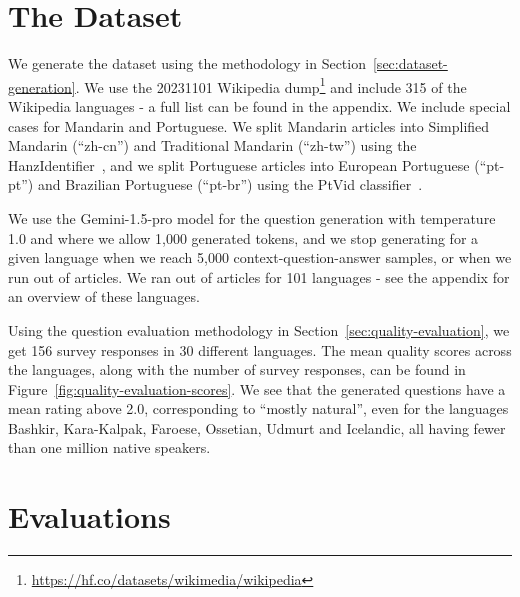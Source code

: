 \documentclass[10pt, a4paper]{article}
\begin{document}
\section{The Dataset}
\label{sec:the-dataset}

We generate the dataset using the methodology in Section~\ref{sec:dataset-generation}. We use the 20231101 Wikipedia dump\footnote{\url{https://hf.co/datasets/wikimedia/wikipedia}} and include 315 of the Wikipedia languages - a full list can be found in the appendix. We include special cases for Mandarin and Portuguese. We split Mandarin articles into Simplified Mandarin (``zh-cn'') and Traditional Mandarin (``zh-tw'') using the HanzIdentifier~\cite{tsroten2024hanzidentifier}, and we split Portuguese articles into European Portuguese (``pt-pt'') and Brazilian Portuguese (``pt-br'') using the PtVid classifier~.

We use the Gemini-1.5-pro model \cite{reid2024gemini} for the question generation with temperature 1.0 and where we allow 1,000 generated tokens, and we stop generating for a given language when we reach 5,000 context-question-answer samples, or when we run out of articles. We ran out of articles for 101 languages - see the appendix for an overview of these languages.

Using the question evaluation methodology in Section~\ref{sec:quality-evaluation}, we get 156 survey responses in 30 different languages. The mean quality scores across the languages, along with the number of survey responses, can be found in Figure~\ref{fig:quality-evaluation-scores}. We see that the generated questions have a mean rating above 2.0, corresponding to ``mostly natural'', even for the languages Bashkir, Kara-Kalpak, Faroese, Ossetian, Udmurt and Icelandic, all having fewer than one million native speakers.


\section{Evaluations}
\label{sec:evaluations}
\end{document}
